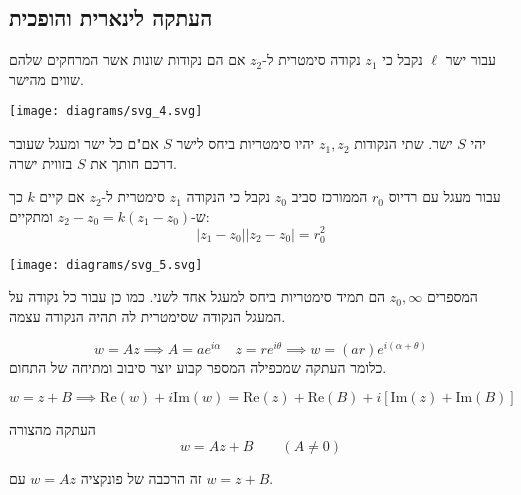 \documentclass{tstextbook}
\begin{document}
\subsection{העתקה לינארית והופכית}

\begin{definition}
עבור ישר \(\ell\) נקבל כי \(z_{1}\) נקודה סימטרית ל-\(z_{2}\) אם הם נקודות שונות אשר המרחקים שלהם שווים מהישר.

\end{definition}
\texttt{[image: diagrams/svg\_4.svg]}
\begin{proposition}
יהי \(S\) ישר. שתי הנקודות \(z_{1},z_{2}\) יהיו סימטריות ביחס לישר \(S\) אם"ם כל ישר ומעגל שעובר דרכם חותך את \(S\) בזווית ישרה. 

\end{proposition}
\begin{definition}
עבור מעגל עם רדיוס \(r_{0}\) הממורכז סביב \(z_{0}\) נקבל כי הנקודה \(z_{1}\) סימטרית ל-\(z_{2}\) אם קיים \(k\) כך ש-\(z_{2}-z_{0}=k(z_{1}-z_{0})\) ומתקיים:
$$|z_{1}-z_{0}||z_{2}-z_{0}|=r_{0}^2$$

\end{definition}
\texttt{[image: diagrams/svg\_5.svg]}
\begin{remark}
המספרים \(z_{0},\infty\) הם תמיד סימטריות ביחס למעגל אחד לשני. כמו כן עבור כל נקודה על המעגל הנקודה שסימטרית לה תהיה הנקודה עצמה.

\end{remark}
\begin{proposition}
$$w=Az\implies A=a e^{i\alpha}\quad  z=r e^{i\theta}\implies w=(a r)e^{i\left( \alpha+\theta \right)}$$
כלומר העתקה שמכפילה המספר קבוע יוצר סיבוב ומתיחה של התחום.

\end{proposition}
\begin{proposition}
$$w=z+B\implies \mathrm{Re}(w)+i\mathrm{Im}(w)=\mathrm{Re}(z)+\mathrm{Re}(B)+i\left[ \mathrm{Im}(z)+\mathrm{Im}(B) \right]$$

\end{proposition}
\begin{definition}
העתקה מהצורה
$$w=A z+B\qquad(A\neq0)$$

\end{definition}
\begin{remark}
זה הרכבה של פונקציה \(w=Az\) עם \(w=z+B\).

\end{remark}
\end{document}
